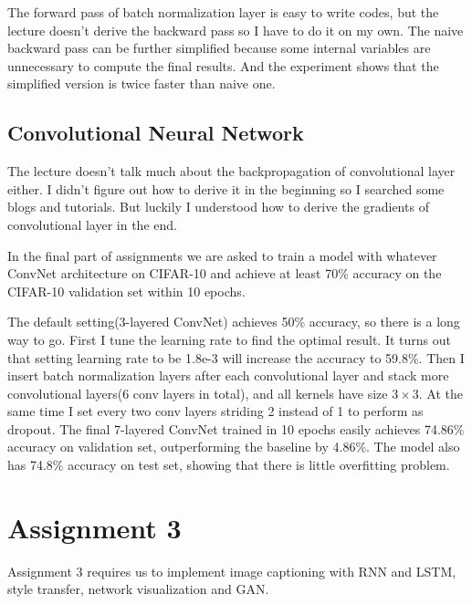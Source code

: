 \documentclass{article} %
\begin{document}
The forward pass of batch normalization layer is easy to write codes, but the lecture doesn't derive the backward pass so I have to do it on my own. The naive backward pass can be further simplified because some internal variables are unnecessary to compute the final results. And the experiment shows that the simplified version is twice faster than naive one.

\subsection{Convolutional Neural Network}
The lecture doesn't talk much about the backpropagation of convolutional layer either. I didn't figure out how to derive it in the beginning so I searched some blogs and tutorials. But luckily I understood how to derive the gradients of convolutional layer in the end. 

In the final part of assignments we are asked to train a model with whatever ConvNet architecture on CIFAR-10 and achieve at least 70\% accuracy on the CIFAR-10 validation set within 10 epochs.

The default setting(3-layered ConvNet) achieves 50\% accuracy, so there is a long way to go. First I tune the learning rate to find the optimal result. It turns out that setting learning rate to be 1.8e-3 will increase the accuracy to 59.8\%. Then I insert batch normalization layers after each convolutional layer and stack more convolutional layers(6 conv layers in total), and all kernels have size $3\times 3$. At the same time I set every two conv layers striding 2 instead of 1 to perform as dropout. The final 7-layered ConvNet trained in 10 epochs easily achieves 74.86\% accuracy on validation set, outperforming the baseline by 4.86\%. The model also has 74.8\% accuracy on test set, showing that there is little overfitting problem.


\section{Assignment 3}
Assignment 3 requires us to implement image captioning with RNN and LSTM, style transfer, network visualization and GAN.
\end{document}
